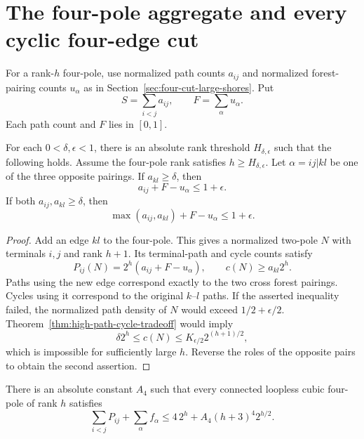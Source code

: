 \section{The four-pole aggregate and every cyclic four-edge cut}
\label{sec:all-four-cuts}

For a rank-$h$ four-pole, use normalized path counts $a_{ij}$ and normalized
forest-pairing counts $u_\alpha$ as in Section~\ref{sec:four-cut-large-shores}.
Put
\[
 S=\sum_{i<j}a_{ij},\qquad F=\sum_\alpha u_\alpha.
\]
Each path count and $F$ lies in $[0,1]$.

\begin{lemma}\label{lem:four-pole-added-edge}
For each $0<\delta,\epsilon<1$, there is an absolute rank threshold
$H_{\delta,\epsilon}$ such that the following holds.
Assume the four-pole rank satisfies $h\ge H_{\delta,\epsilon}$.
Let $\alpha=ij|kl$ be one of the three opposite pairings.
If $a_{kl}\ge\delta$, then
\[
 a_{ij}+F-u_\alpha\le1+\epsilon.
\]
If both $a_{ij},a_{kl}\ge\delta$, then
\[
 \max(a_{ij},a_{kl})+F-u_\alpha\le1+\epsilon.
\]
\end{lemma}

\begin{proof}
Add an edge $kl$ to the four-pole.
This gives a normalized two-pole $N$ with terminals $i,j$ and rank $h+1$.
Its terminal-path and cycle counts satisfy
\[
 P_{ij}(N)=2^h(a_{ij}+F-u_\alpha),\qquad c(N)\ge a_{kl}2^h.
\]
Paths using the new edge correspond exactly to the two cross forest pairings.
Cycles using it correspond to the original $k$--$l$ paths.
If the asserted inequality failed, the normalized path density of $N$
would exceed $1/2+\epsilon/2$.
Theorem~\ref{thm:high-path-cycle-tradeoff} would imply
\[
 \delta2^h\le c(N)\le K_{\epsilon/2}2^{(h+1)/2},
\]
which is impossible for sufficiently large $h$.
Reverse the roles of the opposite pairs to obtain the second assertion.
\end{proof}

\begin{theorem}\label{thm:four-pole-aggregate}
There is an absolute constant $A_4$ such that every connected loopless
cubic four-pole of rank $h$ satisfies
\[
 \sum_{i<j}P_{ij}+\sum_\alpha f_\alpha
 \le4\,2^h+A_4(h+3)^4 2^{h/2}.
\]
\end{theorem}

